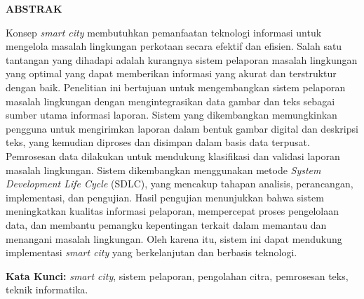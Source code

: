 \vspace{0.3cm}

\begin{center}
{\selectfont\bfseries ABSTRAK}
\end{center}

{\selectfont
\noindent Konsep \textit{smart city} membutuhkan pemanfaatan teknologi informasi untuk mengelola masalah lingkungan perkotaan secara efektif dan efisien. Salah satu tantangan yang dihadapi adalah kurangnya sistem pelaporan masalah lingkungan yang optimal yang dapat memberikan informasi yang akurat dan terstruktur dengan baik. Penelitian ini bertujuan untuk mengembangkan sistem pelaporan masalah lingkungan dengan mengintegrasikan data gambar dan teks sebagai sumber utama informasi laporan. Sistem yang dikembangkan memungkinkan pengguna untuk mengirimkan laporan dalam bentuk gambar digital dan deskripsi teks, yang kemudian diproses dan disimpan dalam basis data terpusat. Pemrosesan data dilakukan untuk mendukung klasifikasi dan validasi laporan masalah lingkungan. Sistem dikembangkan menggunakan metode \textit{System Development Life Cycle} (SDLC), yang mencakup tahapan analisis, perancangan, implementasi, dan pengujian. Hasil pengujian menunjukkan bahwa sistem meningkatkan kualitas informasi pelaporan, mempercepat proses pengelolaan data, dan membantu pemangku kepentingan terkait dalam memantau dan menangani masalah lingkungan. Oleh karena itu, sistem ini dapat mendukung implementasi \textit{smart city} yang berkelanjutan dan berbasis teknologi.

\noindent\textbf{Kata Kunci:} \textit{smart city}, sistem pelaporan, pengolahan citra, pemrosesan teks, teknik informatika.
}

\newpage